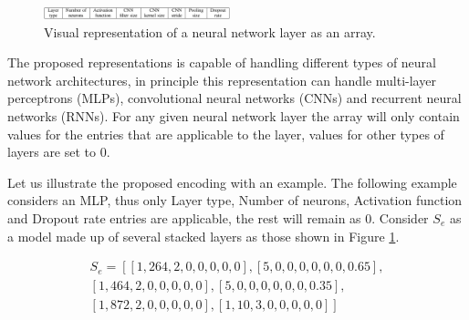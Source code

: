 \documentclass[journal]{IEEEtran}
\begin{document}
\begin{figure}[!htb]
\centering
\includegraphics[width=0.48\textwidth]{img/array_layer.png}
\caption{Visual representation of a neural network layer as an array.}
\label{fig:neural_network_array}
\end{figure}

The proposed representations is capable of handling different types of neural network architectures, in principle this representation can handle multi-layer perceptrons (MLPs), convolutional neural networks (CNNs) and recurrent neural networks (RNNs). For any given neural network layer the array will only contain values for the entries that are applicable to the layer, values for other types of layers are set to 0.

Let us illustrate the proposed encoding with an example. The following example considers an MLP, thus only Layer type, Number of neurons, Activation function and Dropout rate entries are applicable, the rest will remain as 0. Consider $S_e$ as a model made up of several stacked layers as those shown in Figure \ref{fig:neural_network_array}.

\begin{align*}
S_e = \left[ \left[1, 264, 2, 0, 0, 0, 0, 0 \right], \left[5, 0, 0, 0, 0, 0, 0, 0.65 \right], \right. \\
\left. \left[1, 464, 2, 0, 0, 0, 0, 0 \right], \left[5, 0, 0, 0, 0, 0, 0, 0.35 \right], \right. \\
\left. \left[1, 872, 2, 0, 0, 0, 0, 0 \right], \left[1, 10, 3, 0, 0, 0, 0, 0 \right] \right]
\end{align*}
\end{document}
